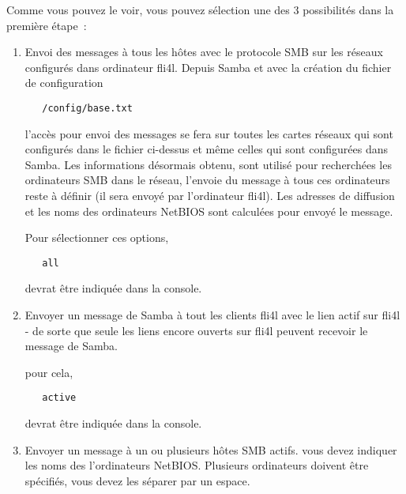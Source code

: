 Comme vous pouvez le voir, vous pouvez sélection une des 3 possibilités dans
la première étape~:

\begin{enumerate}
\item
Envoi des messages à tous les hôtes avec le protocole SMB sur les réseaux configurés
dans ordinateur fli4l. Depuis Samba et avec la création du fichier de configuration

\begin{example}
\begin{verbatim}
   /config/base.txt
\end{verbatim}
\end{example}

l'accès pour envoi des messages se fera sur toutes les cartes réseaux qui sont
configurés dans le fichier ci-dessus et même celles qui sont configurées dans
Samba. Les informations désormais obtenu, sont utilisé pour recherchées les
ordinateurs SMB dans le réseau, l'envoie du message à tous ces ordinateurs reste
à définir (il sera envoyé par l'ordinateur fli4l). Les adresses de diffusion et
les noms des ordinateurs NetBIOS sont calculées pour envoyé le message.

Pour sélectionner ces options,

\begin{example}
\begin{verbatim}
   all
\end{verbatim}
\end{example}

devrat être indiquée dans la console.

\item
Envoyer un message de Samba à tout les clients fli4l avec le lien actif sur
fli4l - de sorte que seule les liens encore ouverts sur fli4l peuvent recevoir
le message de Samba.

pour cela,

\begin{example}
\begin{verbatim}
   active
\end{verbatim}
\end{example}

devrat être indiquée dans la console.

\item
Envoyer un message à un ou plusieurs hôtes SMB actifs. vous devez indiquer les
noms des l'ordinateurs NetBIOS. Plusieurs ordinateurs doivent être spécifiés,
vous devez les séparer par un espace.


\end{enumerate}
